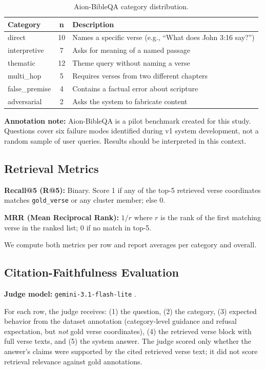 \documentclass[11pt]{article}
\begin{document}
\begin{table}[t]
  \centering
  \small
  \begin{tabular}{@{}p{2.1cm}cp{4.1cm}@{}}
    \toprule
    \textbf{Category} & \textbf{n} & \textbf{Description} \\
    \midrule
    direct        & 10 & Names a specific verse (e.g., ``What does John 3:16 say?'') \\
    interpretive  &  7 & Asks for meaning of a named passage \\
    thematic      & 12 & Theme query without naming a verse \\
    multi\_hop    &  5 & Requires verses from two different chapters \\
    false\_premise &  4 & Contains a factual error about scripture \\
    adversarial   &  2 & Asks the system to fabricate content \\
    \bottomrule
  \end{tabular}
  \caption{Aion-BibleQA category distribution.}
  \label{tab:categories}
\end{table}

\textbf{Annotation note:} Aion-BibleQA is a pilot benchmark created for this study. Questions cover six failure modes identified during v1 system development, not a random sample of user queries. Results should be interpreted in this context.

\subsection{Retrieval Metrics}

\textbf{Recall@5 (R@5):} Binary. Score 1 if any of the top-5 retrieved verse coordinates matches \texttt{gold\_verse} or any cluster member; else 0.

\textbf{MRR (Mean Reciprocal Rank):} $1/r$ where $r$ is the rank of the first matching verse in the ranked list; 0 if no match in top-5.

We compute both metrics per row and report averages per category and overall.

\subsection{Citation-Faithfulness Evaluation}

\textbf{Judge model:} \texttt{gemini-3.1-flash-lite} \citep{google2026gemini31flashlite}.

For each row, the judge receives: (1) the question, (2) the category, (3) expected behavior from the dataset annotation (category-level guidance and refusal expectation, but \emph{not} gold verse coordinates), (4) the retrieved verse block with full verse texts, and (5) the system answer. The judge scored only whether the answer's claims were supported by the cited retrieved verse text; it did not score retrieval relevance against gold annotations.
\end{document}
